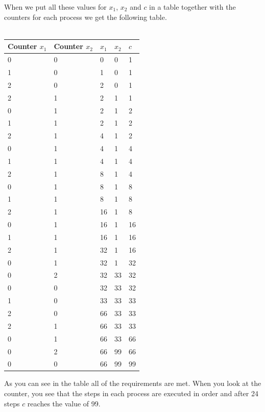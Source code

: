 \documentclass[12pt]{article}
\begin{document}
\noindent When we put all these values for $x_1$, $x_2$ and $c$ in a table together with the counters for each process we get the following table.\\
\\
\begin{center}
\begin{tabular}{| l | l | l | l | l |}
\hline
Counter $x_1$	& Counter $x_2$	& $x_1$	& $x_2$	& $c$	\\
\hline
0 	& 0	&	0	&	0	&	1	\\
1 	& 0	&	1	&	0	&	1	\\
2	& 0	&	2	&	0	&	1	\\
2 	& 1	&	2	&	1	&	1	\\
0 	& 1	&	2	&	1	&	2	\\
1	& 1	&	2	&	1	&	2	\\
2 	& 1	&	4	&	1	&	2	\\
0 	& 1	&	4	&	1	&	4	\\
1	& 1	&	4	&	1	&	4	\\
2 	& 1	&	8	&	1	&	4	\\
0 	& 1	&	8	&	1	&	8	\\
1	& 1	&	8	&	1	&	8	\\
2 	& 1	&	16	&	1	&	8	\\
0 	& 1	&	16	&	1	&	16	\\
1 	& 1	&	16	&	1	&	16	\\
2	& 1	&	32	&	1	&	16	\\
0 	& 1	&	32	&	1	&	32	\\
0 	& 2	&	32	&	33	&	32	\\
0 	& 0	&	32	&	33	&	32	\\
1 	& 0	&	33	&	33	&	33	\\
2	& 0	&	66	&	33	&	33	\\
2	& 1	&	66	&	33	&	33	\\
0	& 1	&	66	&	33	&	66	\\
0 	& 2	&	66	&	99	&	66	\\
0 	& 0	&	66	&	99	&	99	\\
\hline
\end{tabular}
\end{center}
\vspace{3mm}

\noindent As you can see in the table all of the requirements are met. When you look at the counter, you see that the steps in each process are executed in order and  after 24 steps $c$ reaches the value of 99.

\vspace{3mm}
\end{document}

